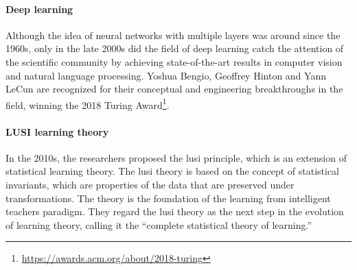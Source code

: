 \paragraph{Deep learning}

Although the idea of neural networks with multiple layers was around since the 1960s,
only in the late 2000s did the field of deep learning catch the attention of the scientific
community by achieving state-of-the-art results in computer vision and natural language
processing.  Yoshua Bengio, Geoffrey
Hinton and Yann LeCun are recognized for their conceptual and engineering
breakthroughs in the field, winning the 2018 Turing Award\footnote{\url{https://awards.acm.org/about/2018-turing}}.

%

%

\paragraph{LUSI learning theory}

In the 2010s, the researchers \textcite{Vapnik2015} proposed the \gls{lusi}
principle, which is an extension of statistical learning theory.  The \gls{lusi}
theory is based on the concept of statistical invariants, which are properties of
the data that are preserved under transformations.  The theory is the foundation of the
learning from intelligent teachers paradigm.  They regard the \gls{lusi} theory as the
next step in the evolution of learning theory, calling it the ``complete statistical
theory of learning.''


